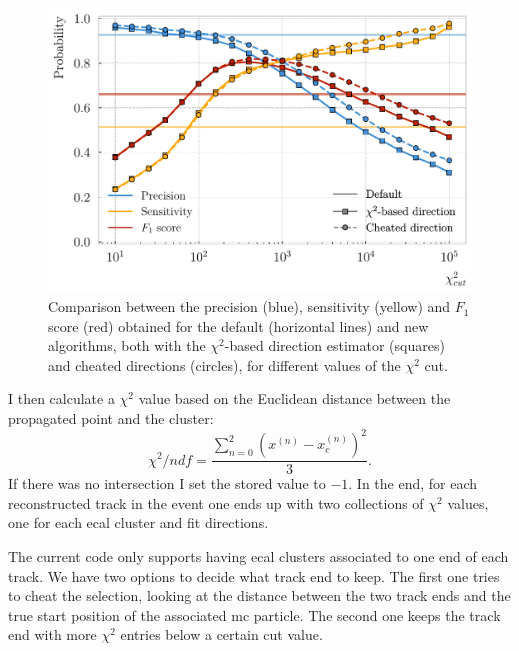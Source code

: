 \begin{figure}[t]
	\centering
	\includegraphics[width=.70\linewidth]{Images/GArSoft_PID/associations/helix_propagation_metrics_no_t0.pdf}
	\caption[Performance of the new track-cluster association algorithm for different values of the $\chi^{2}$ cut.]{Comparison between the precision (blue), sensitivity (yellow) and $F_{1}$ score (red) obtained for the default (horizontal lines) and new algorithms, both with the $\chi^{2}$-based direction estimator (squares) and cheated directions (circles), for different values of the $\chi^{2}$ cut.}
	\label{fig:associations_no_t0}
\end{figure}

I then calculate a $\chi^{2}$ value based on the Euclidean distance between the propagated point and the cluster:
\begin{equation}
	\chi^{2}/ndf = \frac{\sum_{n=0}^{2}\left(x^{(n)}-x^{(n)}_{c}\right)^{2}}{3}.
\end{equation}
If there was no intersection I set the stored value to $-1$. In the end, for each reconstructed track in the event one ends up with two collections of $\chi^{2}$ values, one for each \gls{ecal} cluster and fit directions.

The current code only supports having \gls{ecal} clusters associated to one end of each track. We have two options to decide what track end to keep. The first one tries to cheat the selection, looking at the distance between the two track ends and the true start position of the associated \gls{mc} particle. The second one keeps the track end with more $\chi^{2}$ entries below a certain cut value.


